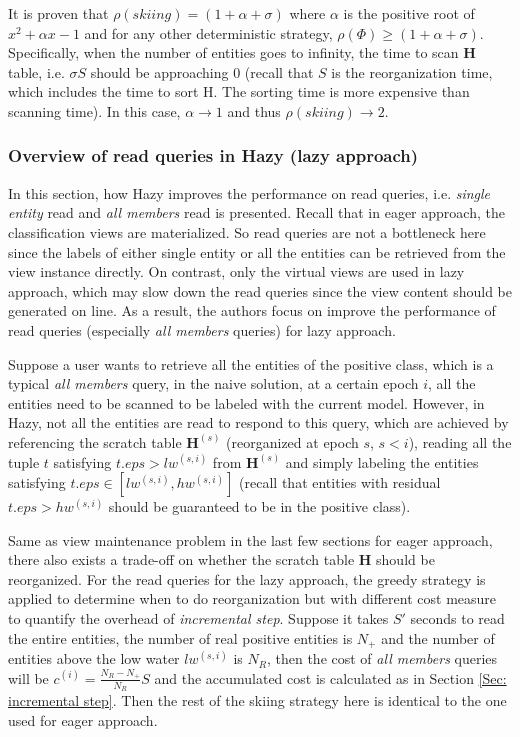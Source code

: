 It is proven that $\rho(skiing) = (1+\alpha + \sigma)$ where $\alpha$ is the positive root of $x^2 + \alpha x - 1$ and for any other deterministic strategy, $\rho(\Phi) \geq (1+\alpha + \sigma)$. Specifically, when the number of entities goes to infinity, the time to scan $\textbf{H}$ table, i.e. $\sigma S$ should be approaching 0 (recall that $S$ is the reorganization time, which includes the time to sort $\text{H}$. The sorting time is more expensive than scanning time). In this case, $\alpha \rightarrow 1$ and thus $\rho(skiing) \rightarrow 2$.

\subsubsection{Overview of read queries in Hazy (lazy approach)}
In this section, how Hazy improves the performance on read queries, i.e. {\em single entity} read and {\em all members} read is presented. Recall that in eager approach, the classification views are materialized. So read queries are not a bottleneck here since the labels of either single entity or all the entities can be retrieved from the view instance directly. On contrast, only the virtual views are used in lazy approach, which may slow down the read queries since the view content should be generated on line. As a result, the authors focus on improve the performance of read queries (especially {\em all members} queries) for lazy approach.

Suppose a user wants to retrieve all the entities of the positive class, which is a typical {\em all members} query, in the naive solution, at a certain epoch $i$, all the entities need to be scanned to be labeled with the current model. However, in Hazy, not all the entities are read to respond to this query, which are achieved by referencing the scratch table $\textbf{H}^{(s)}$ (reorganized at epoch $s$, $s < i$), reading all the tuple $t$ satisfying $t.eps > lw^{(s,i)}$ from $\textbf{H}^{(s)}$ and simply labeling the entities satisfying $t.eps \in [lw^{(s,i)}, hw^{(s,i)}]$ (recall that entities with residual $t.eps > hw^{(s,i)}$ should be guaranteed to be in the positive class). 

Same as view maintenance problem in the last few sections for eager approach, there also exists a trade-off on whether the scratch table $\textbf{H}$ should be reorganized. For the read queries for the lazy approach, the greedy strategy is applied to determine when to do reorganization but with different cost measure to quantify the overhead of {\em incremental step}. Suppose it takes $S'$ seconds to read the entire entities, the number of real positive entities is $N_{+}$ and the number of entities above the low water $lw^{(s,i)}$ is $N_{R}$, then the cost of {\em all members} queries will be $c^{(i)} = \frac{N_{R}-N_{+}}{N_{R}}S$ and the accumulated cost is calculated as in Section \ref{Sec: incremental step}. Then the rest of the skiing strategy here is identical to the one used for eager approach.


